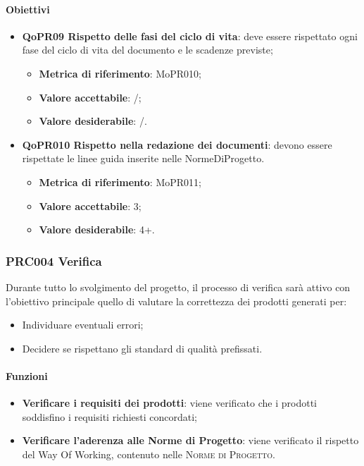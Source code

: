 \documentclass[../piano-di-qualifica.tex]{subfiles}
\begin{document}
\paragraph{Obiettivi}
\label{sub:obiettivi_3}
\begin{itemize}
    \item \textbf{QoPR09 Rispetto delle fasi del ciclo di vita}: deve essere rispettato ogni fase del ciclo di vita del documento e le scadenze previste;
        \begin{itemize}
            \item \textbf{Metrica di riferimento}: MoPR010;
            \item \textbf{Valore accettabile}: /; %
            \item \textbf{Valore desiderabile}: /.
        \end{itemize}
    \item \textbf{QoPR010 Rispetto nella redazione dei documenti}: devono essere rispettate le linee guida inserite nelle NormeDiProgetto.
        \begin{itemize}
            \item \textbf{Metrica di riferimento}: MoPR011;
            \item \textbf{Valore accettabile}: 3; %
            \item \textbf{Valore desiderabile}: 4+.
        \end{itemize}
\end{itemize}

\subsubsection{PRC004 Verifica}
\label{sub:produzione_dei_documenti}
Durante tutto lo svolgimento del progetto, il processo di verifica sarà attivo con l'obiettivo principale quello di valutare la correttezza dei prodotti generati per: 
\begin{itemize}
    \item Individuare eventuali errori;
    \item Decidere se rispettano gli standard di qualità prefissati.
\end{itemize}

\paragraph{Funzioni}
\label{sub:funzioni_4}
\begin{itemize}
    \item \textbf{Verificare i requisiti dei prodotti}: viene verificato che i prodotti soddisfino i requisiti richiesti concordati;
    \item \textbf{Verificare l'aderenza alle Norme di Progetto}: viene verificato il rispetto del Way Of Working, contenuto nelle \textsc{Norme di Progetto}.
\end{itemize}
\end{document}
